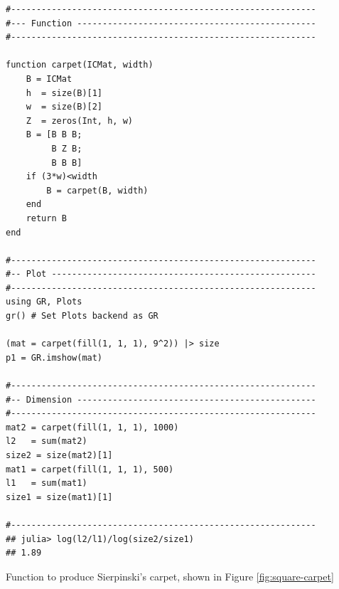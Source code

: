 \documentclass[a4paper,11pt,twoside]{article}
\begin{document}
\begin{listing}[htbp]
\begin{verbatim}
#------------------------------------------------------------
#--- Function -----------------------------------------------
#------------------------------------------------------------

function carpet(ICMat, width)
    B = ICMat
    h  = size(B)[1]
    w  = size(B)[2]
    Z  = zeros(Int, h, w)
    B = [B B B;
         B Z B;
         B B B]
    if (3*w)<width
        B = carpet(B, width)
    end
    return B
end

#------------------------------------------------------------
#-- Plot ----------------------------------------------------
#------------------------------------------------------------
using GR, Plots
gr() # Set Plots backend as GR

(mat = carpet(fill(1, 1, 1), 9^2)) |> size
p1 = GR.imshow(mat)

#------------------------------------------------------------
#-- Dimension -----------------------------------------------
#------------------------------------------------------------
mat2 = carpet(fill(1, 1, 1), 1000)
l2   = sum(mat2)
size2 = size(mat2)[1]
mat1 = carpet(fill(1, 1, 1), 500)
l1   = sum(mat1)
size1 = size(mat1)[1]

#------------------------------------------------------------
## julia> log(l2/l1)/log(size2/size1)
## 1.89
\end{verbatim}
\caption{\label{l-s-carpet}Function to produce Sierpinski's carpet, shown in Figure \ref{fig:square-carpet}}
\end{listing}
\end{document}
